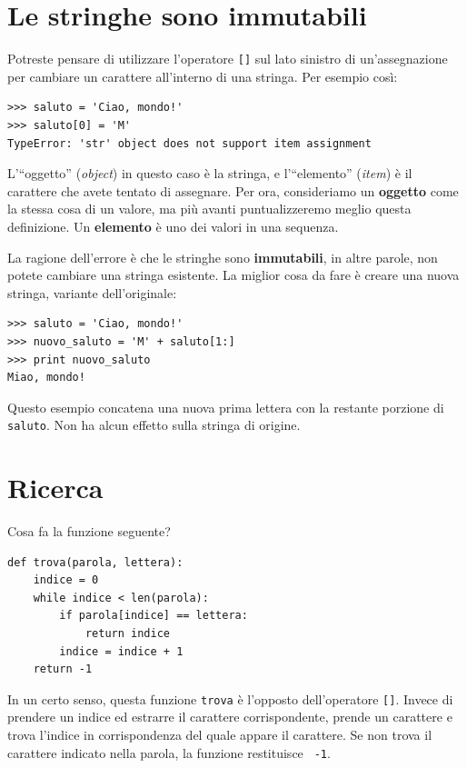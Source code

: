 \documentclass[10pt]{book}
\begin{document}
\section{Le stringhe sono immutabili}

Potreste pensare di utilizzare l'operatore {\tt []} sul lato sinistro di un'assegnazione per cambiare un carattere all'interno di una stringa. Per esempio così:

\begin{verbatim}
>>> saluto = 'Ciao, mondo!'
>>> saluto[0] = 'M'
TypeError: 'str' object does not support item assignment
\end{verbatim}
%
L'``oggetto'' ({\em object}) in questo caso è la stringa, e l'``elemento'' ({\em item}) è il carattere che avete tentato di assegnare. Per ora, consideriamo un {\bf oggetto} come la stessa cosa di un valore, ma più avanti puntualizzeremo meglio questa definizione. Un {\bf elemento} è uno dei valori in una sequenza.

La ragione dell'errore è che le stringhe sono {\bf immutabili}, in altre parole, non potete cambiare una stringa esistente. La miglior cosa da fare è creare una nuova stringa, variante dell'originale:

\begin{verbatim}
>>> saluto = 'Ciao, mondo!'
>>> nuovo_saluto = 'M' + saluto[1:]
>>> print nuovo_saluto
Miao, mondo!
\end{verbatim}
%
Questo esempio concatena una nuova prima lettera con la restante porzione di {\tt saluto}. Non ha alcun effetto sulla stringa di origine.


\section{Ricerca}
\label{find}

Cosa fa la funzione seguente?

\begin{verbatim}
def trova(parola, lettera):
    indice = 0
    while indice < len(parola):
        if parola[indice] == lettera:
            return indice
        indice = indice + 1
    return -1
\end{verbatim}
%
In un certo senso, questa funzione {\tt trova} è l'opposto dell'operatore {\tt []}.
Invece di prendere un indice ed estrarre il carattere corrispondente, prende un carattere e trova l'indice in corrispondenza del quale appare il carattere. Se non trova il carattere indicato nella parola, la funzione restituisce {\tt
-1}.
\end{document}
